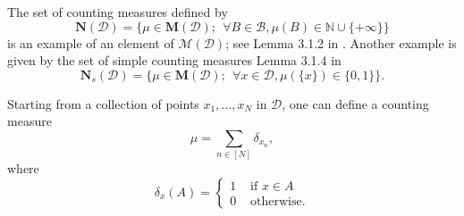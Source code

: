 \documentclass[twoside,11pt]{book}
\newtheorem{proposition}{Proposition}
\numberwithin{theorem}{chapter}
\numberwithin{definition}{chapter}
\numberwithin{proposition}{chapter}
\numberwithin{corollary}{chapter}
\numberwithin{example}{chapter}
\numberwithin{lemma}{chapter}
\numberwithin{assumption}{chapter}
\begin{document}
The set of counting measures defined by
\begin{equation}
\mathbf{N}(\mathcal{D}) = \Big\{ \mu \in \mathbf{M}(\mathcal{D}); \:\: \forall B \in \mathcal{B}, \mu(B) \in \mathbb{N}\cup \{+\infty\} \Big\}
\end{equation}
is an example  of an element of $\mathcal{M}(\mathcal{D})$; see Lemma 3.1.2 in \citep{ScWe08}.
Another example is given by the set of simple counting measures Lemma 3.1.4 in \citep{ScWe08}
\begin{equation}
\mathbf{N}_{s}(\mathcal{D}) = \Big\{ \mu \in \mathbf{M}(\mathcal{D}); \:\: \forall x \in \mathcal{D}, \mu(\{x\}) \in \{0,1\} \Big\}.
\end{equation}

Starting from a collection of points $x_{1}, \dots, x_{N}$ in $\mathcal{D}$, one can define a counting measure
\begin{equation}
\mu = \sum\limits_{n \in [N]}\delta_{x_n},
\end{equation}
where
$$
\delta_{x}(A) = \left\{
    \begin{array}{ll}
     1 & \text{ if } x\in A\\
0 & \text{ otherwise}.
\end{array}
\right.
$$
\end{document}
